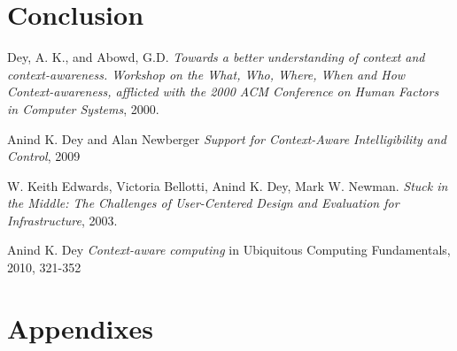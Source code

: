 \documentclass[]{report}
\begin{document}
\chapter{Conclusion}

\begin{thebibliography}{9}

  Dey, A. K., and Abowd, G.D.
  \emph{Towards a better understanding of context and context-awareness. Workshop on the What, Who, Where, When and How Context-awareness, afflicted with the 2000 ACM Conference on Human Factors in Computer Systems},
  2000.
  
  	Anind K. Dey and Alan Newberger
  	\emph{Support for Context-Aware Intelligibility and Control}, 2009
  
  
  W. Keith Edwards, Victoria Bellotti, Anind K. Dey,
  Mark W. Newman.
  \emph{Stuck in the Middle: The Challenges of
  User-Centered Design and Evaluation for Infrastructure},
  2003.
  
	Anind K. Dey
	\emph{Context-aware computing} in Ubiquitous Computing Fundamentals, 2010, 321-352

\end{thebibliography}
\chapter{Appendixes}
\end{document}
